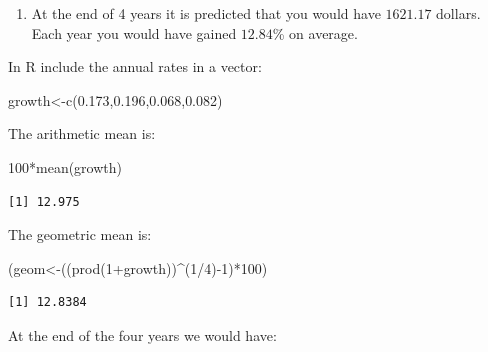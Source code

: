 \documentclass[
  letterpaper,
  DIV=11,
  numbers=noendperiod]{scrreprt}
\newenvironment{Shaded}{\begin{snugshade}}{\end{snugshade}}
\newcommand{\DecValTok}[1]{\textcolor[rgb]{0.68,0.00,0.00}{#1}}
\newcommand{\FloatTok}[1]{\textcolor[rgb]{0.68,0.00,0.00}{#1}}
\newcommand{\FunctionTok}[1]{\textcolor[rgb]{0.28,0.35,0.67}{#1}}
\newcommand{\NormalTok}[1]{\textcolor[rgb]{0.00,0.23,0.31}{#1}}
\newcommand{\OtherTok}[1]{\textcolor[rgb]{0.00,0.23,0.31}{#1}}
\newcommand{\SpecialCharTok}[1]{\textcolor[rgb]{0.37,0.37,0.37}{#1}}
\providecommand{\tightlist}{%
  \setlength{\itemsep}{0pt}\setlength{\parskip}{0pt}}\usepackage{longtable,booktabs,array}
\begin{document}
\begin{blackbox}

\begin{enumerate}
\def\labelenumi{\arabic{enumi}.}
\setcounter{enumi}{1}
\tightlist
\item
  At the end of 4 years it is predicted that you would have \(1621.17\)
  dollars. Each year you would have gained \(12.84\)\% on average.
\end{enumerate}

\end{blackbox}

In R include the annual rates in a vector:

\begin{Shaded}
\begin{Highlighting}[numbers=left,,]
\NormalTok{growth}\OtherTok{\textless{}{-}}\FunctionTok{c}\NormalTok{(}\FloatTok{0.173}\NormalTok{,}\FloatTok{0.196}\NormalTok{,}\FloatTok{0.068}\NormalTok{,}\FloatTok{0.082}\NormalTok{)}
\end{Highlighting}
\end{Shaded}

The arithmetic mean is:

\begin{Shaded}
\begin{Highlighting}[numbers=left,,]
\DecValTok{100}\SpecialCharTok{*}\FunctionTok{mean}\NormalTok{(growth)}
\end{Highlighting}
\end{Shaded}

\begin{verbatim}
[1] 12.975
\end{verbatim}

The geometric mean is:

\begin{Shaded}
\begin{Highlighting}[numbers=left,,]
\NormalTok{(geom}\OtherTok{\textless{}{-}}\NormalTok{((}\FunctionTok{prod}\NormalTok{(}\DecValTok{1}\SpecialCharTok{+}\NormalTok{growth))}\SpecialCharTok{\^{}}\NormalTok{(}\DecValTok{1}\SpecialCharTok{/}\DecValTok{4}\NormalTok{)}\SpecialCharTok{{-}}\DecValTok{1}\NormalTok{)}\SpecialCharTok{*}\DecValTok{100}\NormalTok{)}
\end{Highlighting}
\end{Shaded}

\begin{verbatim}
[1] 12.8384
\end{verbatim}

At the end of the four years we would have:
\end{document}
